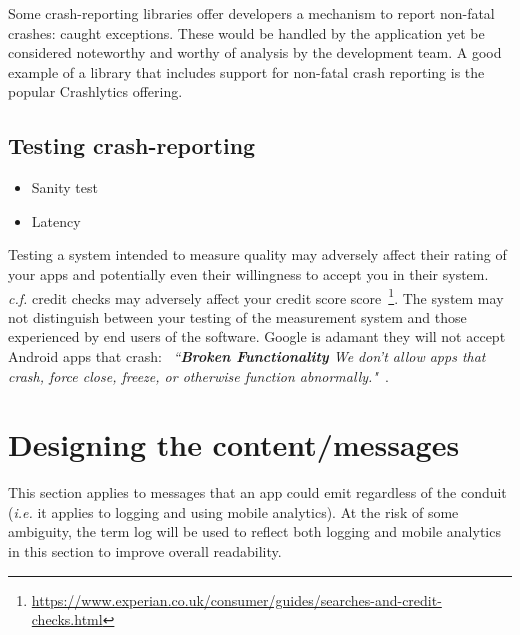 Some crash-reporting libraries offer developers a mechanism to report non-fatal crashes: caught exceptions. These would be handled by the application yet be considered noteworthy and worthy of analysis by the development team. A good example of a library that includes support for non-fatal crash reporting is the popular Crashlytics offering.  

\subsection{Testing crash-reporting}
\begin{itemize}
    \item Sanity test
    \item Latency
\end{itemize}

Testing a system intended to measure quality may adversely affect their rating of your apps and potentially even their willingness to accept you in their system. \emph{c.f.} credit checks may adversely affect your credit score score~\footnote{\url{https://www.experian.co.uk/consumer/guides/searches-and-credit-checks.html}}. The system may not distinguish between your testing of the measurement system and those experienced by end users of the software. Google is adamant they will not accept Android apps that crash: ~\emph{``\textbf{Broken Functionality} We don’t allow apps that crash, force close, freeze, or otherwise function abnormally."}~\cite{google_play_developer_policy_center}.

\section{Designing the content/messages} 
This section applies to messages that an app could emit regardless of the conduit (\emph{i.e.} it applies to logging and using mobile analytics). At the risk of some ambiguity, the term log will be used to reflect both logging and mobile analytics in this section to improve overall readability.


